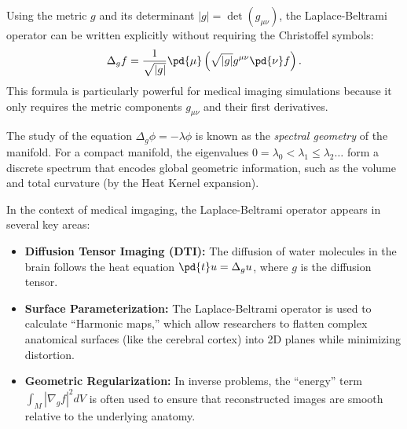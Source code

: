 Using the metric $g$ and its determinant $|g| = \det(g_{\mu\nu})$, the Laplace-Beltrami operator can be written explicitly without requiring the Christoffel symbols:
\begin{equation}
  \Delta_g f = \frac{1}{\sqrt{|g|}} \pd{\mu} \left( \sqrt{|g|} g^{\mu\nu} \pd{\nu} f \right)
.\end{equation}
This formula is particularly powerful for medical imaging simulations because it only requires the metric components $g_{\mu\nu}$ and their first derivatives.

The study of the equation $\Delta_g \phi = -\lambda \phi$ is known as the \emph{spectral geometry} of the manifold. For a compact manifold, the eigenvalues $0 = \lambda_0 < \lambda_1 \leq \lambda_2 \dots$ form a discrete spectrum that encodes global geometric information, such as the volume and total curvature (by the Heat Kernel expansion).

In the context of medical imgaging, the Laplace-Beltrami operator appears in several key areas:
\begin{itemize}
  \item \textbf{Diffusion Tensor Imaging (DTI):} The diffusion of water molecules in the brain follows the heat equation $\pd{t} u = \Delta_g u$, where $g$ is the diffusion tensor.
  \item \textbf{Surface Parameterization:} The Laplace-Beltrami operator is used to calculate ``Harmonic maps,'' which allow researchers to flatten complex anatomical surfaces (like the cerebral cortex) into 2D planes while minimizing distortion.
  \item \textbf{Geometric Regularization:} In inverse problems, the ``energy'' term $\int_M |\nabla_g f|^2 dV$ is often used to ensure that reconstructed images are smooth relative to the underlying anatomy.
\end{itemize}
